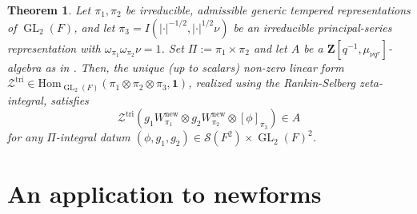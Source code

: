 \documentclass{amsart}
\theoremstyle{plain}
\newtheorem{thm}{Theorem}[subsection]
\theoremstyle{plain}
\theoremstyle{remark}
\DeclareMathOperator{\GL}{GL}
\begin{document}
\begin{thm}
    Let $\pi_1,\pi_2$ be irreducible, admissible generic tempered representations of $\GL_2(F)$, and let $\pi_3=I(|\cdot|^{-1/2},|\cdot|^{1/2}\nu)$ be an irreducible principal-series representation with $\omega_{\pi_1}\omega_{\pi_2}\nu=1$. Set $\Pi:=\pi_1\times\pi_2$ and let $A$ be a $\mathbf{Z}[q^{-1},\mu_{\nu q^\tau}]$-algebra as in \emph{}. Then, the unique (up to scalars) non-zero linear form $\mathcal{Z}^\mathrm{tri}\in\mathrm{Hom}_{\GL_2(F)}(\pi_1\otimes\pi_2\otimes\pi_3,\mathbf{1})$, realized using the Rankin-Selberg zeta-integral, satisfies
    $$\mathcal{Z}^\mathrm{tri}(g_1W_{\pi_1}^\mathrm{new}\otimes g_2W_{\pi_2}^\mathrm{new}\otimes [\phi]_{\pi_3})\in A$$
    for any $\Pi$-integral datum $(\phi,g_1,g_2)\in\mathcal{S}(F^2)\times \GL_2(F)^2$.
\end{thm}




\section{An application to newforms}\label{sec application fo newforms}
\end{document}
